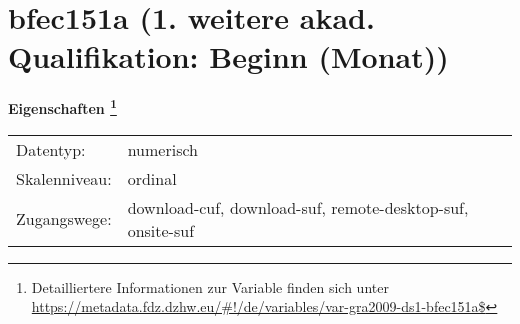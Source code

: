 
    \setcounter{footnote}{0}

    \vspace*{-1.8cm}
	\section{bfec151a (1. weitere akad. Qualifikation: Beginn (Monat))}
	\label{section:bfec151a}



    \vspace*{0.5cm}
    \noindent\textbf{Eigenschaften
	\footnote{Detailliertere Informationen zur Variable finden sich unter
		\url{https://metadata.fdz.dzhw.eu/\#!/de/variables/var-gra2009-ds1-bfec151a$}}}\\
	\begin{tabularx}{\hsize}{@{}lX}
	Datentyp: & numerisch \\
	Skalenniveau: & ordinal \\
	Zugangswege: &
	  download-cuf, 
	  download-suf, 
	  remote-desktop-suf, 
	  onsite-suf
 \\
    \end{tabularx}



